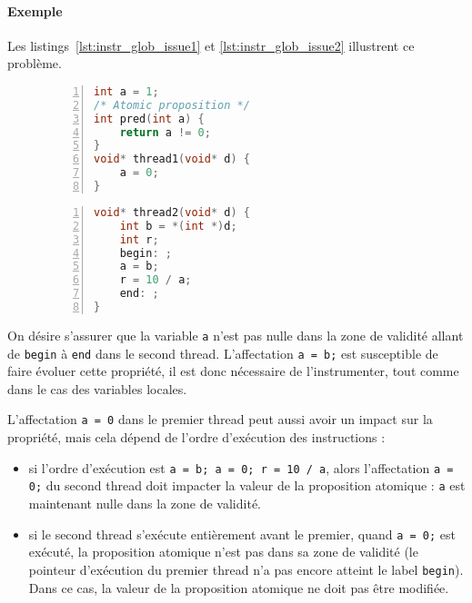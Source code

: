 \paragraph{Exemple}
Les listings~\ref{lst:instr_glob_issue1} et \ref{lst:instr_glob_issue2}
illustrent ce problème.

\begin{figure}
\noindent\begin{minipage}{.45\textwidth}
  \begin{lstlisting}[language=C, frame=single, numbers=left,
    caption=Thread 1, label=lst:instr_glob_issue1]
int a = 1;
/* Atomic proposition */
int pred(int a) {
    return a != 0;
}
void* thread1(void* d) {
    a = 0;
}
\end{lstlisting}
\end{minipage}\hfill
\begin{minipage}{.45\textwidth}
  \begin{lstlisting}[language=C, frame=single, numbers=left,
    caption=Thread 2, label=lst:instr_glob_issue2]
void* thread2(void* d) {
    int b = *(int *)d;
    int r;
    begin: ;
    a = b;
    r = 10 / a;
    end: ;
}
\end{lstlisting}
\end{minipage}
\end{figure}

On désire s'assurer que la variable \texttt{a} n'est pas nulle dans
la zone de validité allant de \texttt{begin} à \texttt{end} dans
le second thread. L'affectation \texttt{a = b;} est susceptible de
faire évoluer cette propriété, il est donc nécessaire de l'instrumenter,
tout comme dans le cas des variables locales.

L'affectation \texttt{a = 0} dans le premier thread peut aussi avoir
un impact sur la propriété, mais cela dépend de l'ordre d'exécution des
instructions :

\begin{itemize}
\item
  si l'ordre d'exécution est \texttt{a = b; a = 0; r = 10 / a}, alors
  l'affectation \texttt{a = 0;} du second thread doit impacter la
  valeur de la proposition atomique : \texttt{a} est maintenant nulle
  dans la zone de validité.
\item
  si le second thread s'exécute entièrement avant le premier, quand
  \texttt{a = 0;} est exécuté, la proposition atomique n'est pas dans
  sa zone de validité (le pointeur d'exécution du premier thread n'a pas
  encore atteint le label \texttt{begin}). Dans ce cas, la valeur de
  la proposition atomique ne doit pas être modifiée.
\end{itemize}

